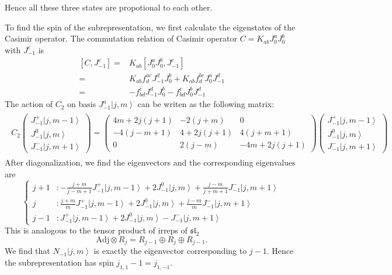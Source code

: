 \documentclass[10pt,a4paper]{article}
\numberwithin{equation}{section}
\newcommand{\ket}[1]{\left| #1 \right\rangle}
\begin{document}
Hence all these three states are propotional to each other. 
\par To find the spin of the subrepresentation, we first calculate the eigenstates of the Casimir operator.
The commutation relation of Casimir operator $C = K_{ab} J^{a}_{0} J^{b}_{0}$ with $J^{c}_{-1}$ is 
\begin{equation}
    \begin{aligned}
        \left[C,J^{c}_{-1}\right] = & K_{ab}\left[J^{a}_{0}J^{b}_{0},J^{c}_{-1}\right]\\
        =& K_{ab}f^{ac}_{d}J^{d}_{-1}J^{b}_{0} + K_{ab}f^{bc}_{d}J^{a}_{0}J^{d}_{-1}\\
        =& -f^{c}_{bd} J^{d}_{-1}J^{b}_{0} - f^{c}_{bd}J^{b}_{0}J^{d}_{-1}
    \end{aligned}
\end{equation}
The action of $C_{2}$ on basis $J^{a}_{-1} \ket{j,m}$ can be writen as the following matrix:
\begin{eqnarray}
    \begin{aligned}
        C_{2} 
    \begin{pmatrix}
    J^{+}_{-1} \ket{j,m-1}\\
    J^{0}_{-1} \ket{j,m}\\
    J^{-}_{-1} \ket{j,m+1}
    \end{pmatrix}
    = \begin{pmatrix}
        4m+2j(j+1) & -2 (j+m) & 0\\
         -4 (j-m+1) & 4 + 2j(j+1) & 4(j+m+1)\\
        0 & 2 (j-m)& -4m + 2j(j+1)
    \end{pmatrix}
    \begin{pmatrix}
        J^{+}_{-1} \ket{j,m-1}\\
        J^{0}_{-1} \ket{j,m}\\
        J^{-}_{-1} \ket{j,m+1}
    \end{pmatrix}
    \end{aligned}
\end{eqnarray}
After diagonalization, we find the eigenvectors and the corresponding eigenvalues are 
\begin{equation}
    \left\{
        \begin{aligned}
            j+1 &: -\frac{j+m}{j-m+1} J^{+}_{-1} \ket{j,m-1} + 2 J^{0}_{-1} \ket{j,m} + \frac{j-m}{j+m+1} J^{-}_{-1} \ket{j,m+1}\\
            j &: \frac{j+m}{m} J^{+}_{-1} \ket{j,m-1} + 2 J^{0}_{-1} \ket{j,m} + \frac{j-m}{m} J^{-}_{-1} \ket{j,m+1}\\
            j-1 &: J^{+}_{-1} \ket{j,m-1} + 2 J^{0}_{-1} \ket{j,m} - J^{-}_{-1} \ket{j,m+1}
        \end{aligned}
    \right.
\end{equation}
This is analogous to the tensor product of irreps of $\mathfrak{sl}_{2}$
\begin{equation}
    \mathrm{Adj} \otimes R_{j} = R_{j-1} \oplus R_{j} \oplus R_{j-1}.
\end{equation}
We find that $N_{-1}\ket{j,m}$ is exactly the eigenvector corresponding to $j-1$. Hence the subrepresentation has spin $j_{1,1}-1 = j_{1,-1}$.



\end{document}
